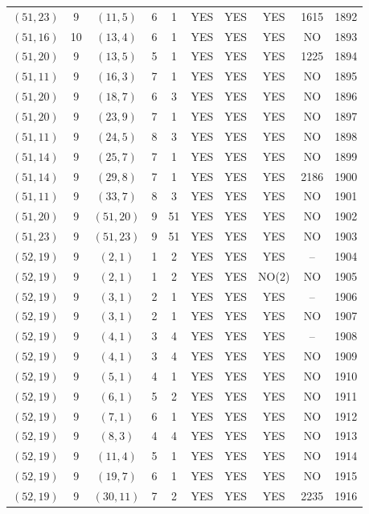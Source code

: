 \begin{longtable}{|c|c|c|c|c|c|c|c|c|c|}
$(51, 23)$ & 9 & $(11, 5)$ & 6 & 1 & YES & YES & YES & 1615 & 1892\\
$(51, 16)$ & 10 & $(13, 4)$ & 6 & 1 & YES & YES & YES & NO & 1893\\
$(51, 20)$ & 9 & $(13, 5)$ & 5 & 1 & YES & YES & YES & 1225 & 1894\\
$(51, 11)$ & 9 & $(16, 3)$ & 7 & 1 & YES & YES & YES & NO & 1895\\
$(51, 20)$ & 9 & $(18, 7)$ & 6 & 3 & YES & YES & YES & NO & 1896\\
$(51, 20)$ & 9 & $(23, 9)$ & 7 & 1 & YES & YES & YES & NO & 1897\\
$(51, 11)$ & 9 & $(24, 5)$ & 8 & 3 & YES & YES & YES & NO & 1898\\
$(51, 14)$ & 9 & $(25, 7)$ & 7 & 1 & YES & YES & YES & NO & 1899\\
$(51, 14)$ & 9 & $(29, 8)$ & 7 & 1 & YES & YES & YES & 2186 & 1900\\
$(51, 11)$ & 9 & $(33, 7)$ & 8 & 3 & YES & YES & YES & NO & 1901\\
$(51, 20)$ & 9 & $(51, 20)$ & 9 & 51 & YES & YES & YES & NO & 1902\\
$(51, 23)$ & 9 & $(51, 23)$ & 9 & 51 & YES & YES & YES & NO & 1903\\
$(52, 19)$ & 9 & $(2, 1)$ & 1 & 2 & YES & YES & YES & -- & 1904\\
$(52, 19)$ & 9 & $(2, 1)$ & 1 & 2 & YES & YES & NO(2) & NO & 1905\\
$(52, 19)$ & 9 & $(3, 1)$ & 2 & 1 & YES & YES & YES & -- & 1906\\
$(52, 19)$ & 9 & $(3, 1)$ & 2 & 1 & YES & YES & YES & NO & 1907\\
$(52, 19)$ & 9 & $(4, 1)$ & 3 & 4 & YES & YES & YES & -- & 1908\\
$(52, 19)$ & 9 & $(4, 1)$ & 3 & 4 & YES & YES & YES & NO & 1909\\
$(52, 19)$ & 9 & $(5, 1)$ & 4 & 1 & YES & YES & YES & NO & 1910\\
$(52, 19)$ & 9 & $(6, 1)$ & 5 & 2 & YES & YES & YES & NO & 1911\\
$(52, 19)$ & 9 & $(7, 1)$ & 6 & 1 & YES & YES & YES & NO & 1912\\
$(52, 19)$ & 9 & $(8, 3)$ & 4 & 4 & YES & YES & YES & NO & 1913\\
$(52, 19)$ & 9 & $(11, 4)$ & 5 & 1 & YES & YES & YES & NO & 1914\\
$(52, 19)$ & 9 & $(19, 7)$ & 6 & 1 & YES & YES & YES & NO & 1915\\
$(52, 19)$ & 9 & $(30, 11)$ & 7 & 2 & YES & YES & YES & 2235 & 1916\\

\end{longtable}
